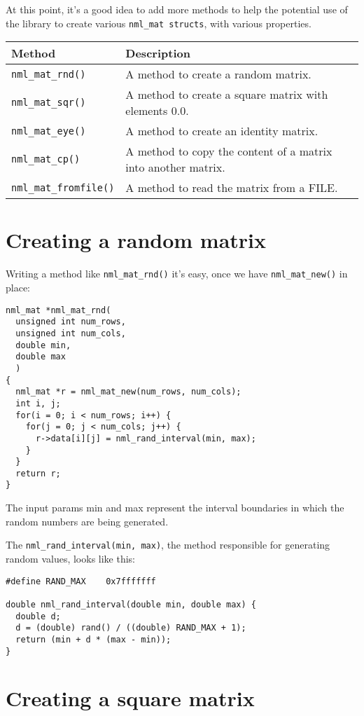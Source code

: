 At this point, it’s a good idea to add more methods to help the potential use of the library to create various {\tt nml\_mat structs}, with various properties.
\\

\begin{tabular}{l@{\quad}l}
Method & 	Description 
\\
\hline 
{\tt nml\_mat\_rnd()} & A method to create a random matrix.
\\
{\tt nml\_mat\_sqr()} & A method to create a square matrix with elements 0.0.
\\
{\tt nml\_mat\_eye()} & A method to create an identity matrix.
\\
{\tt nml\_mat\_cp()} & A method to copy the content of a matrix into another matrix.
\\
{\tt nml\_mat\_fromfile()} & A method to read the matrix from a FILE.
\end{tabular}

\section{Creating a random matrix}

Writing a method like {\tt nml\_mat\_rnd()} it’s easy, once we have {\tt nml\_mat\_new()} in place:

\begin{verbatim}
nml_mat *nml_mat_rnd(
  unsigned int num_rows, 
  unsigned int num_cols, 
  double min, 
  double max
  ) 
{
  nml_mat *r = nml_mat_new(num_rows, num_cols);
  int i, j;
  for(i = 0; i < num_rows; i++) {
    for(j = 0; j < num_cols; j++) {
      r->data[i][j] = nml_rand_interval(min, max);
    }
  }
  return r;
}
\end{verbatim}
The input params min and max represent the interval boundaries in which the random numbers are being generated.

The {\tt nml\_rand\_interval(min, max)}, the method responsible for generating random values, looks like this:
\\


\begin{verbatim}
#define	RAND_MAX	0x7fffffff

double nml_rand_interval(double min, double max) {
  double d;
  d = (double) rand() / ((double) RAND_MAX + 1);
  return (min + d * (max - min));
}
\end{verbatim}

\section{Creating a square matrix}

